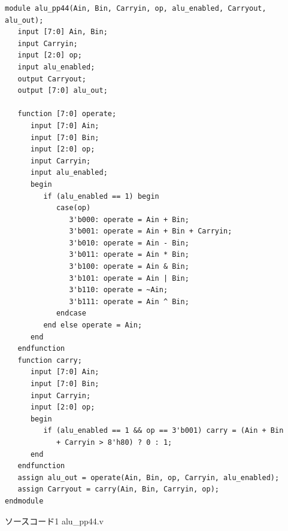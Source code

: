 \documentclass[12pt]{jreport}
\begin{document}
        \begin{center}
            \begin{lstlisting}[basicstyle=\ttfamily\footnotesize, frame=single]
module alu_pp44(Ain, Bin, Carryin, op, alu_enabled, Carryout, alu_out);
   input [7:0] Ain, Bin;
   input Carryin;
   input [2:0] op;
   input alu_enabled;
   output Carryout;
   output [7:0] alu_out;

   function [7:0] operate;
      input [7:0] Ain;
      input [7:0] Bin;
      input [2:0] op;
      input Carryin;
      input alu_enabled;
      begin
         if (alu_enabled == 1) begin
            case(op)
               3'b000: operate = Ain + Bin;
               3'b001: operate = Ain + Bin + Carryin;
               3'b010: operate = Ain - Bin;
               3'b011: operate = Ain * Bin;
               3'b100: operate = Ain & Bin;
               3'b101: operate = Ain | Bin;
               3'b110: operate = ~Ain;
               3'b111: operate = Ain ^ Bin;
            endcase
         end else operate = Ain;
      end
   endfunction
   function carry;
      input [7:0] Ain;
      input [7:0] Bin;
      input Carryin;
      input [2:0] op;
      begin
         if (alu_enabled == 1 && op == 3'b001) carry = (Ain + Bin
            + Carryin > 8'h80) ? 0 : 1;
      end
   endfunction
   assign alu_out = operate(Ain, Bin, op, Carryin, alu_enabled);
   assign Carryout = carry(Ain, Bin, Carryin, op);
endmodule
            \end{lstlisting}
            ソースコード1 alu\_pp44.v
        \end{center}
\end{document}
